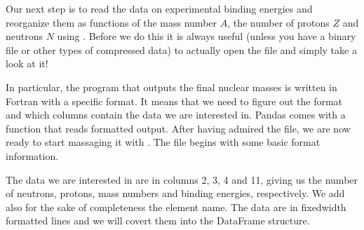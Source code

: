 \documentclass[letterpaper,10pt,english]{sphinxmanual}
\begin{document}
Our next step is to read the data on experimental binding energies and
reorganize them as functions of the mass number \(A\), the number of
protons \(Z\) and neutrons \(N\) using .  Before we do this it is
always useful (unless you have a binary file or other types of compressed
data) to actually open the file and simply take a look at it!

In particular, the program that outputs the final nuclear masses is written in Fortran with a specific format. It means that we need to figure out the format and which columns contain the data we are interested in. Pandas comes with a function that reads formatted output. After having admired the file, we are now ready to start massaging it with . The file begins with some basic format information.

\begin{sphinxVerbatim}[commandchars=\\\{\}]
\end{sphinxVerbatim}

The data we are interested in are in columns 2, 3, 4 and 11, giving us
the number of neutrons, protons, mass numbers and binding energies,
respectively. We add also for the sake of completeness the element name. The data are in fixed\sphinxhyphen{}width formatted lines and we will
covert them into the  DataFrame structure.
\end{document}
